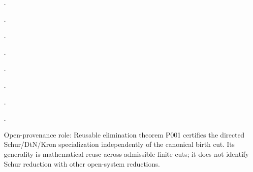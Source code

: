 \cite[\texttt{Finset.sum\_eq\_zero\_iff\_of\_nonneg}]{MathlibOrderedFinsetSumsFabf563a}.

\cite[\texttt{Finset.exists\_max\_image}]{MathlibFinsetMaxFabf563a}.

\cite[\texttt{Fintype.sum\_sum\_type}; \texttt{Fintype.sum\_eq\_single}; \texttt{Fintype.sum\_eq\_zero}]{MathlibFintypeBigOperatorsFabf563a}.

\cite[\texttt{Matrix.mulVecLin}; \texttt{Matrix.mulVecLin\_apply}]{MathlibMatrixToLinFabf563a}.

\cite[finite-dimensional injectivity--surjectivity equivalence]{MathlibFiniteDimensionalFabf563a}.

\cite[module header; Matrix.PosSemidef and Matrix.PosDef definitions]{MathlibMatrixPosDefFabf563a}.

\cite[module header and main results]{MathlibSchurComplementFabf563a}.

\cite[Definition~3.2; Lemmas~3.3--3.4; Theorem~3.9]{SugiyamaSato2023DirectedKron}.

\begin{cnnaInfoBox}{Open-provenance role: Reusable elimination theorem}
P001 certifies the directed Schur/DtN/Kron specialization independently of the canonical birth cut.  Its generality is mathematical reuse across admissible finite cuts; it does not identify Schur reduction with other open-system reductions.
\end{cnnaInfoBox}
